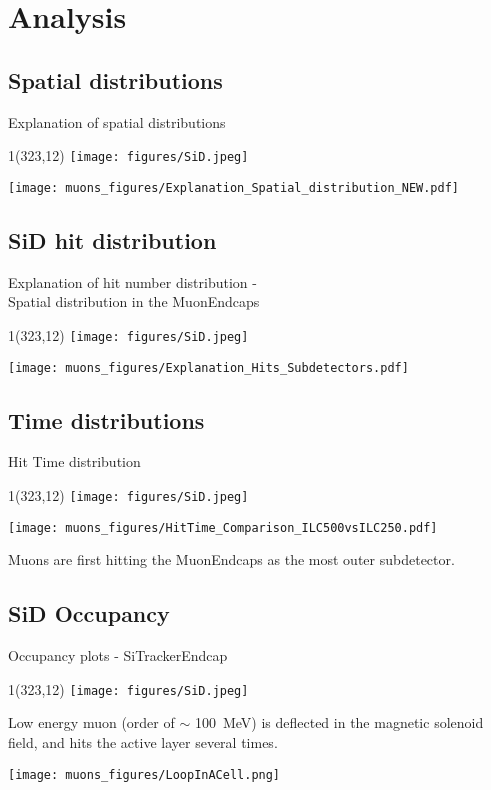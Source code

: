 \documentclass[xcolor={dvipsnames}]{beamer}
\newcommand{\sidlogo}{
  \setlength{\TPHorizModule}{1pt}
  \setlength{\TPVertModule}{1pt}
  \begin{textblock}{1}(323,12)
   \texttt{[image: figures/SiD.jpeg]}
  \end{textblock}
  }
\begin{document}
\section{Analysis}
\subsection{Spatial distributions}
\begin{frame}{Explanation of spatial distributions}
\sidlogo
 \begin{center}
\texttt{[image: muons\_figures/Explanation\_Spatial\_distribution\_NEW.pdf]}
\end{center}
\end{frame}

\subsection{SiD hit distribution}
\begin{frame}{Explanation of hit number distribution -\\ \small Spatial distribution in the MuonEndcaps}
\sidlogo
 \begin{center}
\texttt{[image: muons\_figures/Explanation\_Hits\_Subdetectors.pdf]}
\end{center}
\end{frame}

\subsection{Time distributions}
\begin{frame}{Hit Time distribution}
\sidlogo
 \begin{center}
\texttt{[image: muons\_figures/HitTime\_Comparison\_ILC500vsILC250.pdf]}
\end{center}
Muons are first hitting the MuonEndcaps as the most outer subdetector.
\end{frame}

\subsection{SiD Occupancy}
\begin{frame}{Occupancy plots - \small SiTrackerEndcap}
\sidlogo
Low energy muon (order of $\sim$ \SI{100}{\MeV}) is deflected in the magnetic solenoid field, and hits the active layer several times.
 \begin{center}
\texttt{[image: muons\_figures/LoopInACell.png]}
\end{center}
\end{frame}
\end{document}
